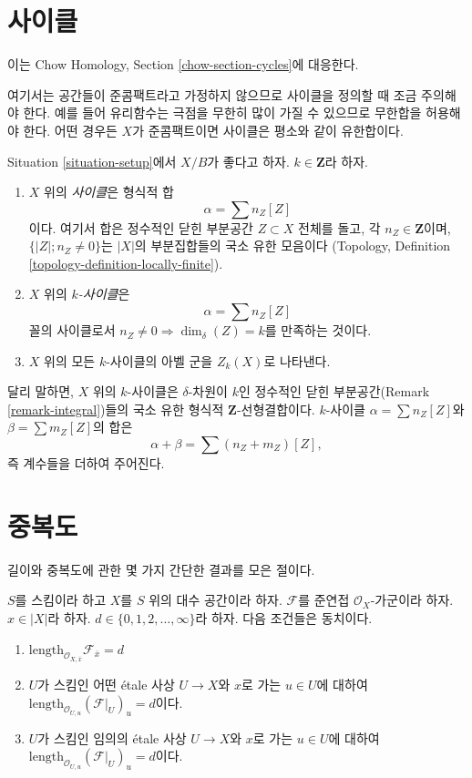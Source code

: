 \section{사이클}
\label{section-cycles}

\noindent
이는 Chow Homology, Section \ref{chow-section-cycles}에 대응한다.

\medskip\noindent
여기서는 공간들이 준콤팩트라고 가정하지 않으므로 사이클을 정의할 때
조금 주의해야 한다. 예를 들어 유리함수는 극점을 무한히 많이 가질 수
있으므로 무한합을 허용해야 한다. 어떤 경우든 $X$가 준콤팩트이면
사이클은 평소와 같이 유한합이다.

\begin{definition}
\label{definition-cycles}
Situation \ref{situation-setup}에서 $X/B$가 좋다고 하자.
$k \in \mathbf{Z}$라 하자.
\begin{enumerate}
\item $X$ 위의 {\it 사이클}은 형식적 합
$$
\alpha = \sum n_Z [Z]
$$
이다. 여기서 합은 정수적인 닫힌 부분공간 $Z \subset X$ 전체를 돌고,
각 $n_Z \in \mathbf{Z}$이며,
$\{|Z|; n_Z \not = 0\}$는 $|X|$의 부분집합들의 국소 유한 모음이다
(Topology, Definition \ref{topology-definition-locally-finite}).
\item $X$ 위의 {\it $k$-사이클}은
$$
\alpha = \sum n_Z [Z]
$$
꼴의 사이클로서 $n_Z \not = 0 \Rightarrow \dim_\delta(Z) = k$를
만족하는 것이다.
\item $X$ 위의 모든 $k$-사이클의 아벨 군을 $Z_k(X)$로 나타낸다.
\end{enumerate}
\end{definition}

\noindent
달리 말하면, $X$ 위의 $k$-사이클은 $\delta$-차원이 $k$인 정수적인
닫힌 부분공간(Remark \ref{remark-integral})들의 국소 유한 형식적
$\mathbf{Z}$-선형결합이다. $k$-사이클 $\alpha = \sum n_Z[Z]$와
$\beta = \sum m_Z[Z]$의 합은
$$
\alpha + \beta = \sum (n_Z + m_Z)[Z],
$$
즉 계수들을 더하여 주어진다.




\section{중복도}
\label{section-multiplicities}

\noindent
길이와 중복도에 관한 몇 가지 간단한 결과를 모은 절이다.

\begin{lemma}
\label{lemma-length}
$S$를 스킴이라 하고 $X$를 $S$ 위의 대수 공간이라 하자.
$\mathcal{F}$를 준연접 $\mathcal{O}_X$-가군이라 하자.
$x \in |X|$라 하자. $d \in \{0, 1, 2, \ldots, \infty\}$라 하자.
다음 조건들은 동치이다.
\begin{enumerate}
\item
$\text{length}_{\mathcal{O}_{X, \overline{x}}} \mathcal{F}_{\overline{x}} = d$
\item $U$가 스킴인 어떤 \'etale 사상 $U \to X$와 $x$로 가는
$u \in U$에 대하여
$\text{length}_{\mathcal{O}_{U, u}} (\mathcal{F}|_U)_u = d$이다.
\item $U$가 스킴인 임의의 \'etale 사상 $U \to X$와 $x$로 가는
$u \in U$에 대하여
$\text{length}_{\mathcal{O}_{U, u}} (\mathcal{F}|_U)_u = d$이다.
\end{enumerate}
\end{lemma}

